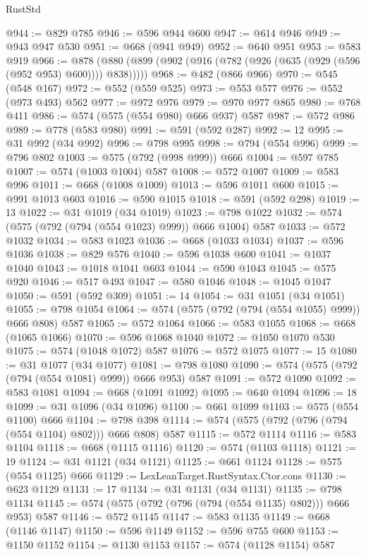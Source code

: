 \begin{lexlean}{RustStd}
\begin{coremodule}
{\begin{coremodule}
{{{{{{{{{{{{{{{{@944 := @829 @785
@946 := @596 @944 @600
@947 := @614 @946
@949 := @943 @947 @530
@951 := @668 (@941 @949)
@952 := @640 @951
@953 := @583 @919
@966 := @878 (@880 (@899 (@902 (@916 (@782 (@926 (@635 (@929 (@596 (@952 @953) @600)))) @838)))))
@968 := @482 (@866 @966)
@970 := @545 (@548 @167)
@972 := @552 (@559 @525)
@973 := @553 @577
@976 := @552 (@973 @493) @562
@977 := @972 @976
@979 := @970 @977 @865
@980 := @768 @411
@986 := @574 (@575 (@554 @980) @666 @937) @587
@987 := @572 @986
@989 := @778 (@583 @980)
@991 := @591 (@592 @287)
@992 := 12
@995 := @31 @992 (@34 @992)
@996 := @798 @995
@998 := @794 (@554 @996)
@999 := @796 @802
@1003 := @575 (@792 (@998 @999)) @666
@1004 := @597 @785
@1007 := @574 (@1003 @1004) @587
@1008 := @572 @1007
@1009 := @583 @996
@1011 := @668 (@1008 @1009)
@1013 := @596 @1011 @600
@1015 := @991 @1013 @603
@1016 := @590 @1015
@1018 := @591 (@592 @298)
@1019 := 13
@1022 := @31 @1019 (@34 @1019)
@1023 := @798 @1022
@1032 := @574 (@575 (@792 (@794 (@554 @1023) @999)) @666 @1004) @587
@1033 := @572 @1032
@1034 := @583 @1023
@1036 := @668 (@1033 @1034)
@1037 := @596 @1036
@1038 := @829 @576
@1040 := @596 @1038 @600
@1041 := @1037 @1040
@1043 := @1018 @1041 @603
@1044 := @590 @1043
@1045 := @575 @920
@1046 := @517 @493
@1047 := @580 @1046
@1048 := @1045 @1047
@1050 := @591 (@592 @309)
@1051 := 14
@1054 := @31 @1051 (@34 @1051)
@1055 := @798 @1054
@1064 := @574 (@575 (@792 (@794 (@554 @1055) @999)) @666 @808) @587
@1065 := @572 @1064
@1066 := @583 @1055
@1068 := @668 (@1065 @1066)
@1070 := @596 @1068 @1040
@1072 := @1050 @1070 @530
@1075 := @574 (@1048 @1072) @587
@1076 := @572 @1075
@1077 := 15
@1080 := @31 @1077 (@34 @1077)
@1081 := @798 @1080
@1090 := @574 (@575 (@792 (@794 (@554 @1081) @999)) @666 @953) @587
@1091 := @572 @1090
@1092 := @583 @1081
@1094 := @668 (@1091 @1092)
@1095 := @640 @1094
@1096 := 18
@1099 := @31 @1096 (@34 @1096)
@1100 := @661 @1099
@1103 := @575 (@554 @1100) @666
@1104 := @798 @398
@1114 := @574 (@575 (@792 (@796 (@794 (@554 @1104) @802))) @666 @808) @587
@1115 := @572 @1114
@1116 := @583 @1104
@1118 := @668 (@1115 @1116)
@1120 := @574 (@1103 @1118)
@1121 := 19
@1124 := @31 @1121 (@34 @1121)
@1125 := @661 @1124
@1128 := @575 (@554 @1125) @666
@1129 := LexLeanTarget.RustSyntax.Ctor.cons
@1130 := @623 @1129
@1131 := 17
@1134 := @31 @1131 (@34 @1131)
@1135 := @798 @1134
@1145 := @574 (@575 (@792 (@796 (@794 (@554 @1135) @802))) @666 @953) @587
@1146 := @572 @1145
@1147 := @583 @1135
@1149 := @668 (@1146 @1147)
@1150 := @596 @1149
@1152 := @596 @755 @600
@1153 := @1150 @1152
@1154 := @1130 @1153
@1157 := @574 (@1128 @1154) @587
}}}}}}}}}}}}}}}}
\end{coremodule}}
\end{coremodule}
\end{lexlean}
